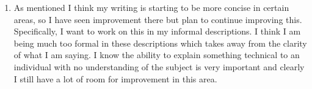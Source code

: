 \documentclass[11pt]{article}
\theoremstyle{nonumberplain}
\begin{document}
\begin{enumerate}
\item As mentioned I think my writing is starting to be more concise in certain areas, so I have seen improvement there but plan to continue improving this. Specifically, I want to work on this in my informal descriptions. I think I am being much too formal in these descriptions which takes away from the clarity of what I am saying. I know the ability to explain something technical to an individual with no understanding of the subject is very important and clearly I still have a lot of room for improvement in this area.
\end{enumerate}
\end{document}
